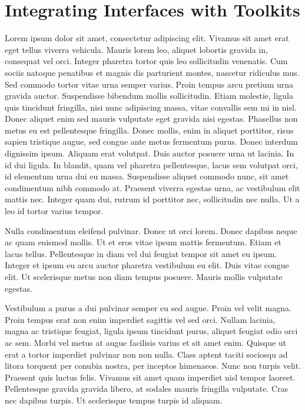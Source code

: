 \chapter{Integrating Interfaces with Toolkits}
Lorem ipsum dolor sit amet, consectetur adipiscing elit.
Vivamus sit amet erat eget tellus viverra vehicula.
Mauris lorem leo, aliquet lobortis gravida in, consequat vel orci.
Integer pharetra tortor quis leo sollicitudin venenatis.
Cum sociis natoque penatibus et magnis dis parturient montes, nascetur ridiculus mus.
Sed commodo tortor vitae urna semper varius.
Proin tempus arcu pretium urna gravida auctor.
Suspendisse bibendum mollis sollicitudin.
Etiam molestie, ligula quis tincidunt fringilla, nisi nunc adipiscing massa, vitae convallis sem mi in nisl.
Donec aliquet enim sed mauris vulputate eget gravida nisi egestas.
Phasellus non metus eu est pellentesque fringilla.
Donec mollis, enim in aliquet porttitor, risus sapien tristique augue, sed congue ante metus fermentum purus.
Donec interdum dignissim ipsum.
Aliquam erat volutpat.
Duis auctor posuere urna ut lacinia.
In id dui ligula.
In blandit, quam vel pharetra pellentesque, lacus sem volutpat orci, id elementum urna dui eu massa.
Suspendisse aliquet commodo nunc, sit amet condimentum nibh commodo at.
Praesent viverra egestas urna, ac vestibulum elit mattis nec.
Integer quam dui, rutrum id porttitor nec, sollicitudin nec nulla.
Ut a leo id tortor varius tempor.

Nulla condimentum eleifend pulvinar.
Donec ut orci lorem.
Donec dapibus neque ac quam euismod mollis.
Ut et eros vitae ipsum mattis fermentum.
Etiam et lacus tellus.
Pellentesque in diam vel dui feugiat tempor sit amet eu ipsum.
Integer et ipsum eu arcu auctor pharetra vestibulum eu elit.
Duis vitae congue elit.
Ut scelerisque metus non diam tempus posuere.
Mauris mollis vulputate egestas.

Vestibulum a purus a dui pulvinar semper eu sed augue.
Proin vel velit magna.
Proin tempus erat non enim imperdiet sagittis vel sed orci.
Nullam lacinia, magna ac tristique feugiat, ligula ipsum tincidunt purus, aliquet feugiat odio orci ac sem.
Morbi vel metus at augue facilisis varius et sit amet enim.
Quisque ut erat a tortor imperdiet pulvinar non non nulla.
Class aptent taciti sociosqu ad litora torquent per conubia nostra, per inceptos himenaeos.
Nunc non turpis velit.
Praesent quis luctus felis.
Vivamus sit amet quam imperdiet nisl tempor laoreet.
Pellentesque gravida gravida libero, at sodales mauris fringilla vulputate.
Cras nec dapibus turpis.
Ut scelerisque tempus turpis id aliquam.

